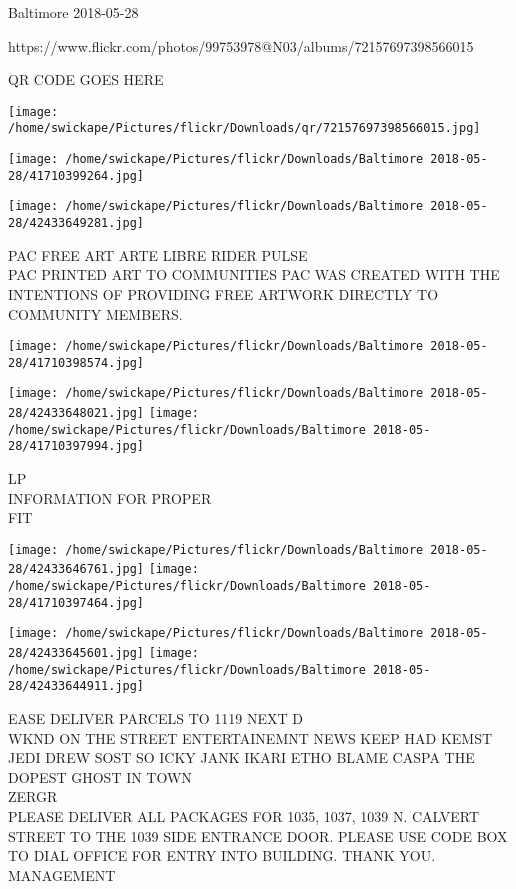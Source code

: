 \documentclass[10pt,letterpaper]{article}
\begin{document}
Baltimore 2018-05-28

https://www.flickr.com/photos/99753978@N03/albums/72157697398566015

QR CODE GOES HERE

\texttt{[image: /home/swickape/Pictures/flickr/Downloads/qr/72157697398566015.jpg]}
\pagebreak

\texttt{[image: /home/swickape/Pictures/flickr/Downloads/Baltimore 2018-05-28/41710399264.jpg]}

\vspace{0.25in}
\texttt{[image: /home/swickape/Pictures/flickr/Downloads/Baltimore 2018-05-28/42433649281.jpg]}

PAC FREE ART ARTE LIBRE RIDER PULSE\\
PAC PRINTED ART TO COMMUNITIES PAC WAS CREATED WITH THE INTENTIONS OF PROVIDING FREE ARTWORK DIRECTLY TO COMMUNITY MEMBERS.\\
\pagebreak

\texttt{[image: /home/swickape/Pictures/flickr/Downloads/Baltimore 2018-05-28/41710398574.jpg]}

\vspace{0.25in}
\texttt{[image: /home/swickape/Pictures/flickr/Downloads/Baltimore 2018-05-28/42433648021.jpg]}
\texttt{[image: /home/swickape/Pictures/flickr/Downloads/Baltimore 2018-05-28/41710397994.jpg]}

LP\\
INFORMATION FOR PROPER\\
FIT\\
\pagebreak

\texttt{[image: /home/swickape/Pictures/flickr/Downloads/Baltimore 2018-05-28/42433646761.jpg]}
\texttt{[image: /home/swickape/Pictures/flickr/Downloads/Baltimore 2018-05-28/41710397464.jpg]}

\texttt{[image: /home/swickape/Pictures/flickr/Downloads/Baltimore 2018-05-28/42433645601.jpg]}
\texttt{[image: /home/swickape/Pictures/flickr/Downloads/Baltimore 2018-05-28/42433644911.jpg]}

EASE DELIVER PARCELS TO 1119 NEXT D\\
WKND ON THE STREET ENTERTAINEMNT NEWS KEEP HAD KEMST JEDI DREW SOST SO ICKY JANK IKARI ETHO BLAME CASPA THE DOPEST GHOST IN TOWN\\
ZERGR\\
PLEASE DELIVER ALL PACKAGES FOR 1035, 1037, 1039 N. CALVERT STREET TO THE 1039 SIDE ENTRANCE DOOR.  PLEASE USE CODE BOX TO DIAL OFFICE FOR ENTRY INTO BUILDING.  THANK YOU.  MANAGEMENT\\
\pagebreak
\end{document}
